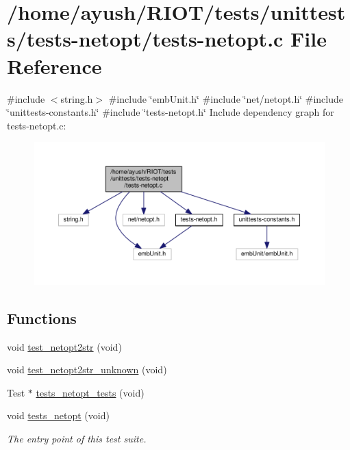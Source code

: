 \hypertarget{tests-netopt_8c}{}\section{/home/ayush/\+R\+I\+O\+T/tests/unittests/tests-\/netopt/tests-\/netopt.c File Reference}
\label{tests-netopt_8c}
{\ttfamily \#include $<$string.\+h$>$}\newline
{\ttfamily \#include \char`\"{}emb\+Unit.\+h\char`\"{}}\newline
{\ttfamily \#include \char`\"{}net/netopt.\+h\char`\"{}}\newline
{\ttfamily \#include \char`\"{}unittests-\/constants.\+h\char`\"{}}\newline
{\ttfamily \#include \char`\"{}tests-\/netopt.\+h\char`\"{}}\newline
Include dependency graph for tests-\/netopt.c\+:
\nopagebreak
\begin{figure}[H]
\begin{center}
\leavevmode
\includegraphics[width=350pt]{tests-netopt_8c__incl}
\end{center}
\end{figure}
\subsection*{Functions}
\textbf{ }\par
\begin{DoxyCompactItemize}
\item 
void \hyperlink{tests-netopt_8c_a1e06cdb916cbef87a2df25bf54839fd8}{test\+\_\+netopt2str} (void)
\item 
void \hyperlink{tests-netopt_8c_a0231f9da54bcb6641ba245e21ba19855}{test\+\_\+netopt2str\+\_\+unknown} (void)
\item 
Test $\ast$ \hyperlink{tests-netopt_8c_a5113077204e030cef7614ca96ae3ff14}{tests\+\_\+netopt\+\_\+tests} (void)
\item 
void \hyperlink{group__unittests_gaf3cee24f6368b87755b19538a4f1564c}{tests\+\_\+netopt} (void)
\begin{DoxyCompactList}\small\item\em The entry point of this test suite. \end{DoxyCompactList}\end{DoxyCompactItemize}




